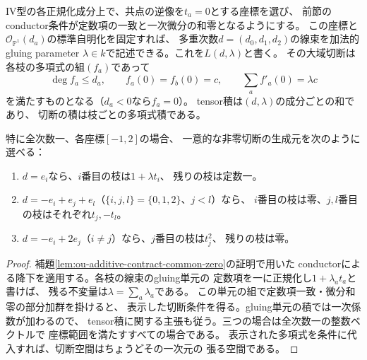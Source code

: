 \begin{lemma}[IV型の線束の合成写像]
\label{lem:ou-iv-jet-relations}
IV型の各正規化成分上で、共点の逆像を$t_a=0$とする座標を選び、
前節のconductor条件が定数項の一致と一次微分の和零となるようにする。
この座標と$\mathcal O_{\mathbb P^1}(d_a)$の標準自明化を固定すれば、
多重次数$d=(d_0,d_1,d_2)$の線束を加法的gluing parameter
$\lambda\in k$で記述できる。これを$L(d,\lambda)$と書く。
その大域切断は各枝の多項式の組$(f_a)$であって
\[
 \deg f_a\leq d_a,\qquad
 f_a(0)=f_b(0)=c,\qquad
 \sum_a f'_a(0)=\lambda c
\]
を満たすものとなる（$d_a<0$なら$f_a=0$）。
tensor積は$(d,\lambda)$の成分ごとの和であり、
切断の積は枝ごとの多項式積である。

特に全次数一、各座標$[-1,2]$の場合、
一意的な非零切断の生成元を次のように選べる：
\begin{enumerate}[label=(\roman*)]
\item $d=e_i$なら、$i$番目の枝は$1+\lambda t_i$、
      残りの枝は定数一。
\item $d=-e_i+e_j+e_l$（$\{i,j,l\}=\{0,1,2\}$、$j<l$）なら、
      $i$番目の枝は零、$j,l$番目の枝はそれぞれ$t_j,-t_l$。
\item $d=-e_i+2e_j$（$i\ne j$）なら、$j$番目の枝は$t_j^2$、
      残りの枝は零。
\end{enumerate}
\end{lemma}
\begin{proof}
補題\ref{lem:ou-additive-contract-common-zero}の証明で用いた
conductorによる降下を適用する。各枝の線束のgluing単元の
定数項を一に正規化し$1+\lambda_a t_a$と書けば、
残る不変量は$\lambda=\sum_a\lambda_a$である。
この単元の組で定数項一致・微分和零の部分加群を掛けると、
表示した切断条件を得る。gluing単元の積では一次係数が加わるので、
tensor積に関する主張も従う。三つの場合は全次数一の整数ベクトルで
座標範囲を満たすすべての場合である。
表示された多項式を条件に代入すれば、切断空間はちょうどその一次元の
張る空間である。
\end{proof}


